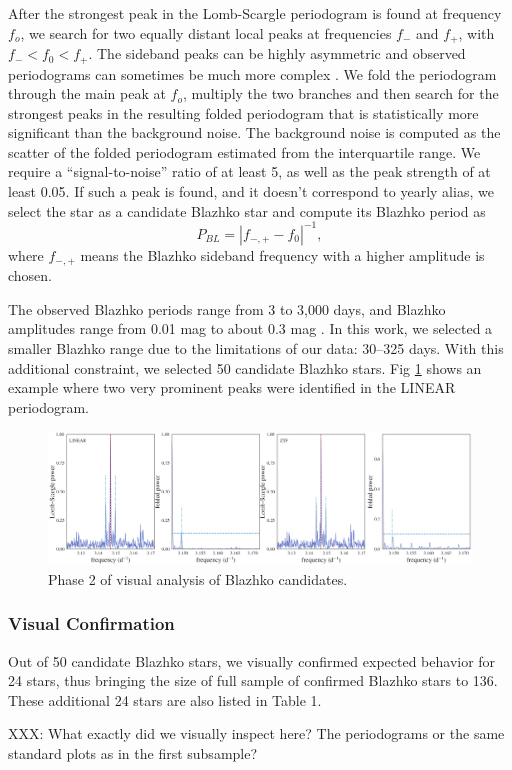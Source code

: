 After the strongest peak in the Lomb-Scargle periodogram is found at frequency $f_o$, we search for  two equally
distant local peaks at frequencies $f_-$ and $f_+$, with $f_- < f_0 < f_+$.  The sideband peaks can be highly asymmetric
\cite{2003ApJ...598..597A} and observed periodograms can sometimes be much more complex \cite{2007MNRAS.377.1263S}.  
We fold the periodogram through the main peak at $f_o$, multiply the two branches and then search for the strongest peaks
in the resulting folded periodogram that is statistically more significant than the background noise. The background noise
is computed as the scatter of the folded periodogram estimated from the interquartile range. We require a ``signal-to-noise''
ratio of at least 5, as well as the peak strength of at least 0.05. 
If such a peak is found,
and it doesn't correspond to yearly alias, we select the star as a candidate Blazhko star and compute
its Blazhko period as 
\begin{equation*}
P_{BL} = |f_{-,+} - f_0|^{-1},
\end{equation*}
where $f_{-,+}$ means the Blazhko sideband frequency with a higher amplitude is chosen. 

The observed Blazhko periods range from 3 to 3,000 days, and Blazhko amplitudes range from 0.01 mag to about 0.3 mag \citep{2007MNRAS.377.1263S}. In this work, we selected a smaller Blazhko range due to the limitations of our data: 30--325 days. 
With this additional constraint, we selected 50 candidate Blazhko stars. 
Fig \ref{fig:phase2} shows an example where two very prominent peaks were identified in the LINEAR periodogram. 

\begin{figure}[ht]
  \centering       
  \includegraphics[width=17cm]{periodogram7048826.png}
    \caption{Phase 2 of visual analysis of Blazhko candidates.}
    \label{fig:phase2}
\end{figure}


\subsubsection{Visual Confirmation} 

Out of 50 candidate Blazhko stars, we visually confirmed expected behavior for 24 stars, thus bringing
the size of full sample of confirmed Blazhko stars to 136. These additional 24 stars are also listed in Table 1.

XXX: What exactly did we visually inspect here? The periodograms or the same standard plots as in the first subsample? 


 